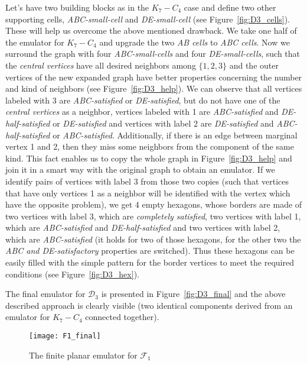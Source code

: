 \documentclass[envcountsect,envcountsame]{llncs}
\renewenvironment{accumulate}{}{}
\newcommand{\KK}{\ensuremath{{K}_7 - C_4}\xspace}
\newcommand{\DD}{\ensuremath{\mathcal{D}_3}\xspace}
\newcommand{\FF}{\ensuremath{\mathcal{F}_1}\xspace}
\begin{document}
\begin{accumulate}
Let's have two building blocks as in the \KK case and define two other
supporting cells, \textit{ABC-small-cell} and \textit{DE-small-cell} (see
Figure~\ref{fig:D3_cells}).  These will help us overcome the above
mentioned drawback.  We take one half of the emulator for \KK and upgrade the
two \textit{AB cells} to \textit{ABC cells}.  Now we surround the graph with
four \textit{ABC-small-cells} and four \textit{DE-small-cells}, such that
the \textit{central vertices} have all desired neighbors among $\{1,2,3\}$
and the outer vertices of the new expanded graph have better properties
concerning the number and kind of neighbors (see Figure~\ref{fig:D3_help}). 
We can observe that all vertices labeled with 3 are \textit{ABC-satisfied}
or \textit{DE-satisfied}, but do not have one of the \textit{central
vertices} as a neighbor, vertices labeled with 1 are \textit{ABC-satisfied}
and \textit{DE-half-satisfied} or \textit{DE-satisfied} and vertices with
label 2 are \textit{DE-satisfied} and \textit{ABC-half-satisfied} or
\textit{ABC-satisfied}.  Additionally, if there is an edge between marginal
vertex 1 and 2, then they miss some neighbors from the component of the same
kind.  This fact enables us to copy the whole graph in
Figure~\ref{fig:D3_help} and join it in a smart way with the original graph
to obtain an emulator.  If we identify pairs of vertices with label 3 from
those two copies (such that vertices that have only vertices 1 as a neighbor
will be identified with the vertex which have the opposite problem), we get
4 empty hexagons, whose borders are made of two vertices with label 3, which
are \textit{completely satisfied}, two vertices with label 1, which are
\textit{ABC-satisfied} and \textit{DE-half-satisfied} and two vertices with
label 2, which are \textit{ABC-satisfied} (it holds for two of those
hexagons, for the other two the \textit{ABC and DE-satisfactory} properties
are switched).  Thus these hexagons can be easily filled with the simple
pattern for the border vertices to meet the required conditions (see
Figure~\ref{fig:D3_hex}).

The final emulator for \DD is presented in Figure~\ref{fig:D3_final} and the
above described approach is clearly visible (two identical components derived from an emulator for
\KK connected together). 



\begin{figure}[tb]
\texttt{[image: F1\_final]}
\caption{The finite planar emulator for \FF}
\label{fig:F1_final}
\end{figure}


\end{accumulate}
\end{document}

